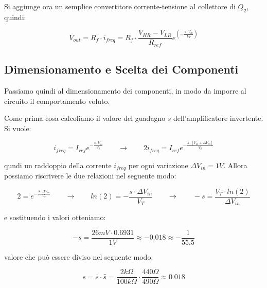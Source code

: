 Si aggiunge ora un semplice convertitore corrente-tensione al collettore di $Q_2$, quindi:

\begin{displaymath}
    V_{out}=R_f\cdot i_{freq}=
    R_f\cdot \frac{V_{HR}-V_{LR}}{R_{ref}}e^{\left(-\frac{s\cdot V_{in}}{V_T}\right)}
\end{displaymath}



\subsection*{Dimensionamento e Scelta dei Componenti}


Passiamo quindi al dimensionamento dei componenti, in modo da imporre al circuito il
comportamento voluto.

Come prima cosa calcoliamo il valore del guadagno $s$ dell'amplificatore invertente.
Si vuole:

\begin{displaymath}
    i_{freq}=I_{ref}e^{-\frac{s\cdot V_{in}}{V_T}}
    \qquad
    \rightarrow
    \qquad
    2i_{freq}=I_{ref}e^{-\frac{s\cdot[V_{in}+\Delta V_{in}]}{V_T}}
\end{displaymath}

qundi un raddoppio della corrente $i_{freq}$ per ogni variazione $\Delta V_{in}=1V$.
Allora possiamo riscrivere le due relazioni nel seguente modo:

\begin{displaymath}
    2=e^{-\frac{s\cdot\Delta V_{in}}{V_T}}
    \qquad
    \rightarrow
    \qquad
    ln(2)=-\frac{s\cdot\Delta V_{in}}{V_T}
    \qquad
    \rightarrow
    \qquad
    -s=\frac{V_T\cdot ln(2)}{\Delta V_{in}}
\end{displaymath}

e sostituendo i valori otteniamo:

\begin{displaymath}
    -s=\frac{26mV\cdot 0.6931}{1V}\approx-0.018\approx-\frac{1}{55.5}
\end{displaymath}

valore che può essere diviso nel seguente modo:

\begin{displaymath}
    s=\bar{s}\cdot\hat{s}=\frac{2k\Omega}{100k\Omega}\cdot\frac{440\Omega}{490\Omega}
    \approx 0.018
\end{displaymath}

